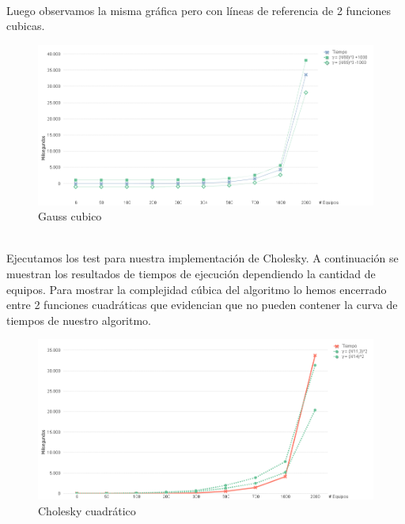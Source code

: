 \\

Luego observamos la misma gráfica pero con líneas de referencia de 2 funciones cubicas. \\

\begin{figure}[H]
\centering
\includegraphics[width=1\textwidth]{IMG/gauss cubico.png}
\caption{Gauss cubico}
\label{fig:Gauss cubico}
\end{figure}

\\
Ejecutamos los test para nuestra implementación de Cholesky. A continuación se muestran los resultados de tiempos de ejecución dependiendo la cantidad de equipos.
Para mostrar la complejidad cúbica del algoritmo lo hemos encerrado entre 2 funciones cuadráticas que evidencian que no pueden contener la curva de tiempos de nuestro algoritmo.\\


\begin{figure}[H]
\centering
\includegraphics[width=1\textwidth]{IMG/cholesky cuadratico.png}
\caption{Cholesky cuadrático}
\label{fig:Cholesky cuadrático}
\end{figure}

\\

